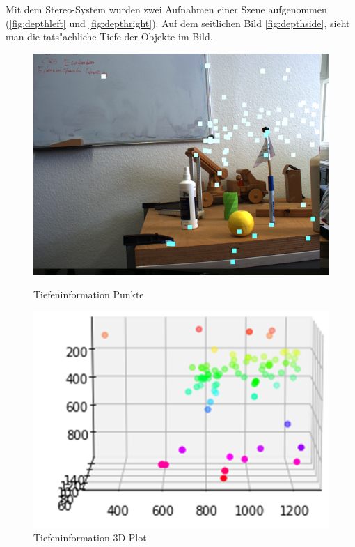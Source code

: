 \noindent Mit dem Stereo-System wurden zwei Aufnahmen einer Szene aufgenommen (\ref{fig:depthleft} und \ref{fig:depthright}). Auf dem seitlichen Bild \ref{fig:depthside}, sieht man die tats"achliche Tiefe der Objekte im Bild.

\begin{figure}[!htb]
	\includegraphics[width=\linewidth]{bilder/depth_result}
	\caption{Tiefeninformation Punkte}\label{fig:depthpoints}
	\endminipage\hfill
	\includegraphics[width=\linewidth]{bilder/depth_coord}
	\caption{Tiefeninformation 3D-Plot}\label{fig:depthplot}
	\endminipage\hfill
\end{figure}

